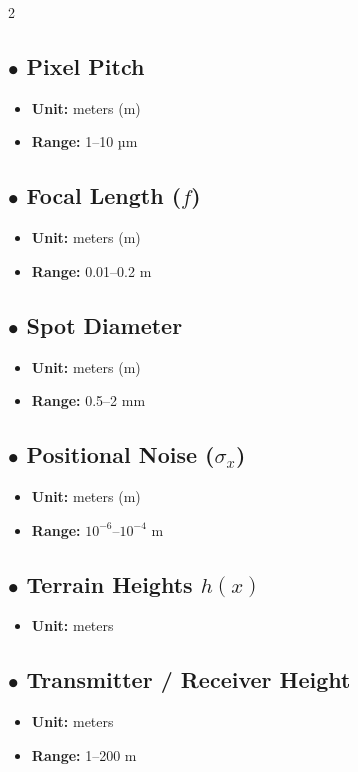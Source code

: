 \documentclass{article}
\begin{document}
\begin{multicols}{2}
	\subsection*{$\bullet$ Pixel Pitch}
	\begin{itemize}
		\item \textbf{Unit:} meters (m)
		\item \textbf{Range:} 1--10 µm
	\end{itemize}
	
	\subsection*{$\bullet$ Focal Length ($f$)}
	\begin{itemize}
		\item \textbf{Unit:} meters (m)
		\item \textbf{Range:} 0.01--0.2 m
	\end{itemize}
	
	\subsection*{$\bullet$ Spot Diameter}
	\begin{itemize}
		\item \textbf{Unit:} meters (m)
		\item \textbf{Range:} 0.5--2 mm
	\end{itemize}
	
	\subsection*{$\bullet$ Positional Noise ($\sigma_x$)}
	\begin{itemize}
		\item \textbf{Unit:} meters (m)
		\item \textbf{Range:} $10^{-6}$--$10^{-4}$ m
	\end{itemize}
	
	\subsection*{$\bullet$ Terrain Heights $h(x)$}
	\begin{itemize}
		\item \textbf{Unit:} meters
	\end{itemize}
	
	\subsection*{$\bullet$ Transmitter / Receiver Height}
	\begin{itemize}
		\item \textbf{Unit:} meters
		\item \textbf{Range:} 1--200 m
	\end{itemize}
	

\end{multicols}
\end{document}
